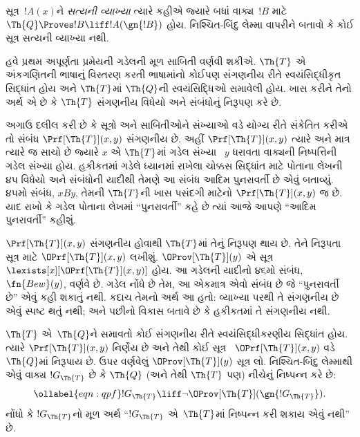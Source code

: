 \begin{prob}
  સૂત્ર~$!A(x)$ને
  \emph{સત્યની વ્યાખ્યા}
  ત્યારે કહીએ જ્યારે બધાં
  વાક્ય~$!B$ માટે
  $\Th{Q}
  \Proves !B \liff !A(\gn{!B})$
  હોય. નિશ્ચિત-બિંદુ લેમ્મા
  વાપરીને બતાવો કે કોઈ
  સૂત્ર સત્યની
  વ્યાખ્યા નથી.
\end{prob}
\endgroup


\begingroup
\makeatletter{}\makeatother


\label{guunit:OLP-0315}


હવે પ્રથમ અપૂર્ણતા પ્રમેયની
ગડેલની મૂળ સાબિતી
વર્ણવી શકીએ. $\Th{T}$
એ અંકગણિતની ભાષાનું
વિસ્તરણ કરતી ભાષામાંનો
કોઈપણ સંગણનીય રીતે
સ્વયંસિદ્ધીકૃત સિદ્ધાંત હોય
અને $\Th{T}$માં
$\Th{Q}$ની સ્વયંસિદ્ધિઓ
સમાવેલી હોય. ખાસ કરીને
તેનો અર્થ એ છે કે
$\Th{T}$ સંગણનીય
વિધેયો અને સંબંધોનું
નિરૂપણ કરે છે.

અગાઉ દલીલ કરી છે કે
સૂત્રો અને સાબિતીઓને
સંખ્યાઓ વડે યોગ્ય રીતે
સંકેતિત કરીએ તો સંબંધ
$\Prf[\Th{T}](x,y)$
સંગણનીય છે. અહીં
$\Prf[\Th{T}](x,y)$
ત્યારે અને માત્ર ત્યારે જ
સાચો છે જ્યારે $x$ એ
$\Th{T}$માં ગડેલ સંખ્યા
~$y$ ધરાવતા વાક્યની
નિષ્પત્તિની ગડેલ
સંખ્યા હોય. હકીકતમાં
ગડેલે ધ્યાનમાં રાખેલા
ચોક્કસ સિદ્ધાંત માટે
પોતાના લેખની ૪૫ વિધેયો
અને સંબંધોની યાદીથી
તેમણે આ સંબંધ આદિમ
પુનરાવર્તી છે એવું બતાવ્યું.
૪૫મો સંબંધ, $x B y$,
તેમની $\Th{T}$ની ખાસ
પસંદગી માટેનો
$\Prf[\Th{T}](x,y)$
જ છે. યાદ રાખો કે
ગડેલ પોતાના લેખમાં
``પુનરાવર્તી'' કહે છે
ત્યાં આજે આપણે
``આદિમ પુનરાવર્તી''
કહીશું.

$\Prf[\Th{T}](x,y)$ સંગણનીય
હોવાથી $\Th{T}$માં તેનું
નિરૂપણ થાય છે. તેને
નિરૂપતા સૂત્ર માટે
$\OPrf[\Th{T}](x,y)$
લખીશું. $\OProv[\Th{T}](y)$
એ સૂત્ર
$\lexists[x][\OPrf[\Th{T}](x,y)]$
હોય. આ ગડેલની યાદીનો
૪૬મો સંબંધ,
$\fn{Bew}(y)$, વર્ણવે છે.
ગડેલ નોંધે છે તેમ,
આ એકમાત્ર એવો સંબંધ
છે જે ``પુનરાવર્તી છે''
એવું કહી શકાતું નથી.
કદાચ તેમનો અર્થ આ હતો:
વ્યાખ્યા પરથી તે સંગણનીય
છે એવું સ્પષ્ટ થતું નથી;
અને પછીનો વિકાસ બતાવે
છે કે હકીકતમાં તે
સંગણનીય નથી.

$\Th{T}$ એ~$\Th{Q}$ને
સમાવતો કોઈ
સંગણનીય રીતે સ્વયંસિદ્ધીકરણીય સિદ્ધાંત
હોય. ત્યારે
$\Prf[\Th{T}](x, y)$
નિર્ણેય છે અને તેથી
કોઈ સૂત્ર
~$\OPrf[\Th{T}](x, y)$
વડે~$\Th{Q}$માં નિરૂપાય
છે. ઉપર વર્ણવેલું
$\OProv[\Th{T}](y)$
સૂત્ર લો. નિશ્ચિત-બિંદુ
લેમ્માથી એવું વાક્ય
$!G_\Th{T}$ છે કે
$\Th{Q}$ (અને તેથી
$\Th{T}$ પણ) નીચેનું
નિષ્પન્ન કરે છે:
\begin{equation}
\ollabel{eqn:qpf}
!G_\Th{T} \liff \lnot \OProv[\Th{T}](\gn{!G_\Th{T}}).
\end{equation}
નોંધો કે $!G_\Th{T}$નો
મૂળ અર્થ ``$!G_\Th{T}$
એ~$\Th{T}$માં
નિષ્પન્ન કરી શકાય એવું નથી'' છે.

